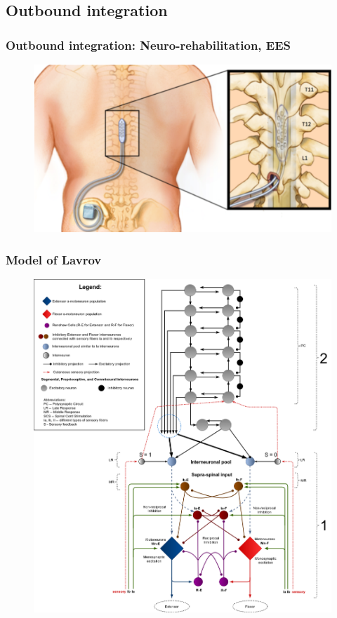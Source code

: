 \documentclass[12pt, aspectratio=169]{beamer}
\begin{document}
\subsection{Outbound integration}
\begin{frame}
  \frametitle{Outbound integration: Neuro-rehabilitation, EES}
  \begin{figure}
    \includegraphics[width=0.6\linewidth]{epidural_stimulation_spinal_cord}
  \end{figure}
\end{frame}
\begin{frame}
  \frametitle{Model of Lavrov}
  \begin{figure}
    \includegraphics[width=0.48\linewidth]{spinal-cord-diagram}
  \end{figure}
\end{frame}
\end{document}

